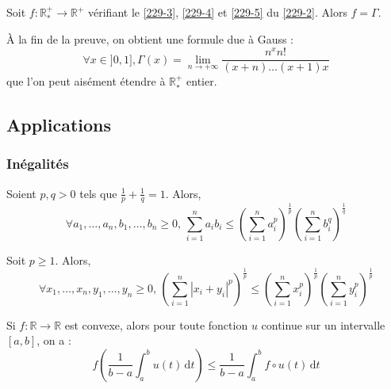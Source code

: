 
	\begin{theorem}
		Soit $f : \mathbb{R}^+_* \rightarrow \mathbb{R}^+$ vérifiant le \cref{229-3}, \cref{229-4} et \cref{229-5} du \cref{229-2}. Alors $f = \Gamma$.
	\end{theorem}

	\begin{remark}
		À la fin de la preuve, on obtient une formule due à Gauss :
		\[ \forall x \in ]0, 1], \Gamma(x) = \lim_{n \rightarrow +\infty} \frac{n^x n!}{(x+n) \dots (x+1)x} \]
		que l'on peut aisément étendre à $\mathbb{R}^+_*$ entier.
	\end{remark}

	\subsection{Applications}

	\subsubsection{Inégalités}


	\begin{proposition}
		Soient $p, q > 0$ tels que $\frac{1}{p} + \frac{1}{q} = 1$. Alors,
		\[ \forall a_1, \dots, a_n, b_1, \dots, b_n \geq 0, \, \sum_{i=1}^n a_i b_i \leq \left( \sum_{i=1}^n a_i^p \right)^{\frac{1}{p}} \left( \sum_{i=1}^n b_i^q \right)^{\frac{1}{q}} \]
	\end{proposition}

	\begin{proposition}
		Soit $p \geq 1$. Alors,
		\[ \forall x_1, \dots, x_n, y_1, \dots, y_n \geq 0, \, \left( \sum_{i=1}^n |x_i + y_i|^p \right)^{\frac{1}{p}} \leq \left( \sum_{i=1}^n x_i^p \right)^{\frac{1}{p}} \left( \sum_{i=1}^n y_i^p \right)^{\frac{1}{p}} \]
	\end{proposition}


	\begin{proposition}
		Si $f : \mathbb{R} \rightarrow \mathbb{R}$ est convexe, alors pour toute fonction $u$ continue sur un intervalle $[a, b]$, on a :
		\[ f \left( \frac{1}{b-a} \int_a^b u(t) \, \mathrm{d}t \right) \leq \frac{1}{b-a} \int_a^b f \circ u (t) \, \mathrm{d}t \]
	\end{proposition}

